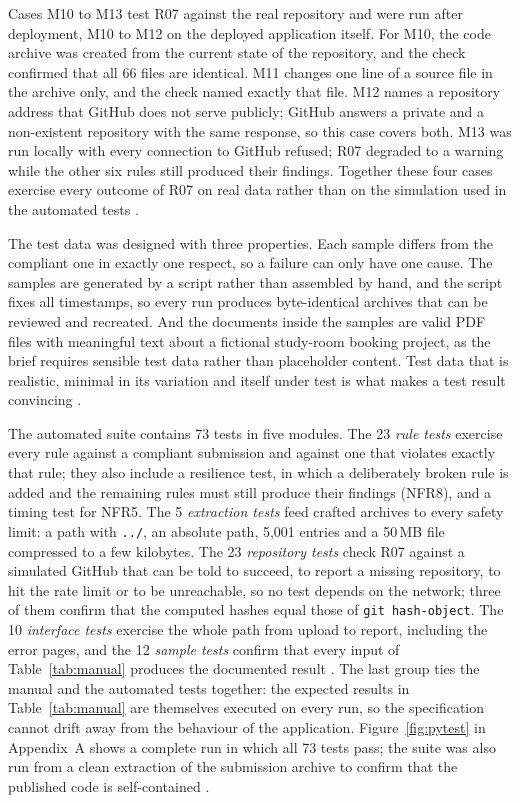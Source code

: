 \documentclass[a4paper,11pt]{article}
\begin{document}
Cases M10 to M13 test R07 against the real repository and were run after
deployment, M10 to M12 on the deployed application itself. For M10, the code
archive was created from the current state of the repository, and the check
confirmed that all 66 files are identical. M11 changes one line of a source file
in the archive only, and the check named exactly that file. M12 names a repository
address that GitHub does not serve publicly; GitHub answers a private and a
non-existent repository with the same response, so this case covers both. M13 was
run locally with every connection to GitHub refused; R07 degraded to a warning
while the other six rules still produced their findings. Together these four
cases exercise every outcome of R07 on real data rather than on the simulation
used in the automated tests \citep{Winters2020}.

The test data was designed with three properties. Each sample differs from the
compliant one in exactly one respect, so a failure can only have one cause. The
samples are generated by a script rather than assembled by hand, and the script
fixes all timestamps, so every run produces byte-identical archives that can be
reviewed and recreated. And the documents inside the samples are valid PDF files
with meaningful text about a fictional study-room booking project, as the brief
requires sensible test data rather than placeholder content. Test data that is
realistic, minimal in its variation and itself under test is what makes a test
result convincing \citep{Khorikov2020}.

The automated suite contains 73 tests in five modules. The 23 \textit{rule
tests} exercise every rule against a compliant submission and against one that
violates exactly that rule; they also include a resilience test, in which a
deliberately broken rule is added and the remaining rules must still produce
their findings (NFR8), and a timing test for NFR5. The 5 \textit{extraction
tests} feed crafted archives to every safety limit: a path with \texttt{../}, an
absolute path, 5,001 entries and a 50\,MB file compressed to a few kilobytes. The
23 \textit{repository tests} check R07 against a simulated GitHub that can be told
to succeed, to report a missing repository, to hit the rate limit or to be
unreachable, so no test depends on the network; three of them confirm that the
computed hashes equal those of \texttt{git hash-object}. The 10 \textit{interface
tests} exercise the whole path from upload to report, including the error pages,
and the 12 \textit{sample tests} confirm that every input of
Table~\ref{tab:manual} produces the documented result \citep{Khorikov2020}. The last group ties the manual and the automated tests
together: the expected results in Table~\ref{tab:manual} are themselves executed
on every run, so the specification cannot drift away from the behaviour of the
application. Figure~\ref{fig:pytest} in Appendix~A shows a complete run in which all 73 tests
pass; the suite was also run from a clean extraction of the submission archive
to confirm that the published code is self-contained \citep{Pytest2025}.
\end{document}
